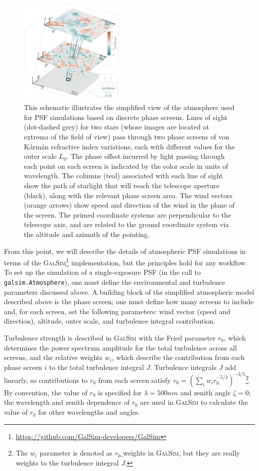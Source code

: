 \documentclass[twocolumn]{aastex631}
\newcommand{\galsim}{\textsc{GalSim}\xspace}
\newcommand{\vk}{von K\'arm\'an\xspace}
\begin{document}
\begin{figure}
\includegraphics[width=0.45\textwidth]{sim_schematic.png}
\caption{
    This schematic illustrates the simplified view of the atmosphere used for PSF simulations based on discrete phase screens. 
    Lines of sight (dot-dashed grey) for two stars (whose images are located at extrema of the field of view) pass through two phase screens of \vk refractive index variations, each with different values for the outer scale $L_0$. 
    The phase offset incurred by light passing through each point on each screen is indicated by the color scale in units of wavelength.
    The columns (teal) associated with each line of sight show the path of starlight that will reach the telescope aperture (black), along with the relevant phase screen area. 
    The wind vectors (orange arrows) show speed and direction of the wind in the plane of the screen.
    The primed coordinate systems are perpendicular to the telescope axis, and are related to the ground coordinate system via the altitude and azimuth of the pointing.
    \label{fig:schematic}
    }
\end{figure}

From this point, we will describe the details of  atmospheric PSF simulations in terms of the \galsim\footnote{\url{https://github.com/GalSim-developers/GalSim}} \citep{rowe_galsim_2015} implementation, but the principles hold for any workflow.
To set up the simulation of a single-exposure PSF (in the call to \texttt{galsim.Atmosphere}), one must define the environmental and turbulence parameters discussed above.
A building block of the simplified atmospheric model described above is the phase screen; one must define how many screens to include and, for each screen, set the following parameters: wind vector (speed and direction), altitude, outer scale, and turbulence integral contribution.

Turbulence strength is described in \galsim with the Fried parameter $r_0$, which determines the power spectrum amplitude for the total turbulence across all screens, and the relative weights $w_i$, which describe the contribution from each phase screen $i$ to the total turbulence integral $J$.
Turbulence integrals $J$ add linearly, so contributions to $r_0$ from each screen satisfy $r_0 = (\sum_{i} w_i r_0^{-5/3})^{-3/5}$\footnote{The $w_i$ parameter is denoted as $r_{0}\_$weights in \galsim, but they are really weights to the turbulence integral $J$.}.
By convention, the value of $r_0$ is specified for $\lambda=500\unit{nm}$ and zenith angle $\zeta=0$; the wavelength and zenith dependence of $r_0$ are used in \galsim to calculate the value of $r_0$ for other wavelengths and angles.
\end{document}
